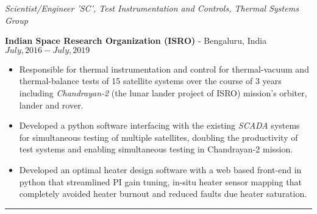 \medskip

\noindent\textit{Scientist/Engineer 'SC', Test Instrumentation and Controls, Thermal Systems Group}

\textbf{Indian Space Research Organization (ISRO)} - Bengaluru, India \hfill $July, 2016 - July, 2019$

\begin{itemize}
        \item Responsible for thermal instrumentation and control for thermal-vacuum and thermal-balance tests of 15 satellite systems over the course of 3 years including \textit{Chandrayan-2} (the lunar lander project of ISRO) mission's orbiter, lander and rover.
        \item Developed a python software interfacing with the existing \textit{SCADA} systems for simultaneous testing of multiple satellites, doubling the productivity of test systems and enabling simultaneous testing in Chandrayan-2 mission.
	\item Developed an optimal heater design software with a web based front-end in python that streamlined PI gain tuning, in-situ heater sensor mapping that completely avoided heater burnout and reduced faults due heater saturation.
\end{itemize}
\noindent\rule{\textwidth}{0.4pt}
